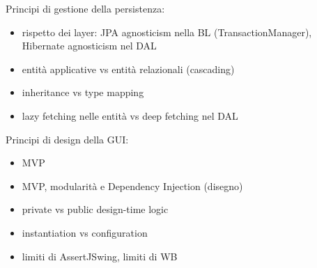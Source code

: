 Principi di gestione della persistenza:
\begin{itemize}
    \item rispetto dei layer: JPA agnosticism nella BL (TransactionManager), Hibernate agnosticism nel DAL
    \item entità applicative vs entità relazionali (cascading)
    \item inheritance vs type mapping
    \item lazy fetching nelle entità vs deep fetching nel DAL
\end{itemize}

Principi di design della GUI:
\begin{itemize}
    \item MVP
    \item MVP, modularità e Dependency Injection (disegno)
    \item private vs public design-time logic
    \item instantiation vs configuration
    \item limiti di AssertJSwing, limiti di WB
\end{itemize}